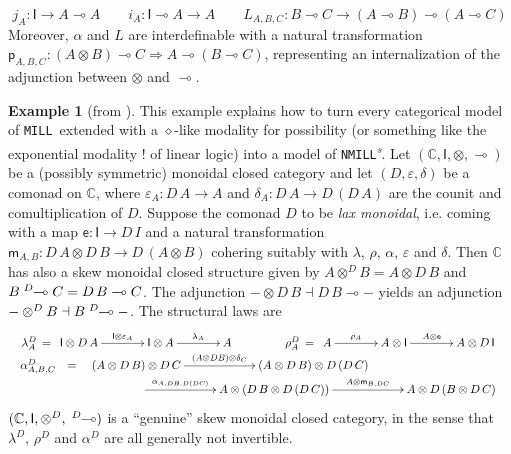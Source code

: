 \documentclass[submission,copyright,creativecommons]{eptcs}
\theoremstyle{definition}
\newtheorem{example}{Example}[section]
\newcommand{\ot}{\otimes}
\newcommand{\lolli}{\multimap}
\newcommand{\I}{\mathsf{I}}
\newcommand{\otd}{\ot^D}
\newcommand{\lollid}{\;\textsuperscript{$D$}\!\!\lolli}
\newcommand{\MILL}{\texttt{MILL}}
\newcommand{\NMILL}{\texttt{NMILL}}
\newcommand{\SkNMILL}{\NMILL\textsuperscript{\textit{s}}}
\begin{document}
\[
j_A : \I \to A \lolli A \qquad i_A : \I \lolli A \to A \qquad L_{A,B,C} : B \lolli C \to (A \lolli B) \lolli (A \lolli C)
\]
Moreover, $\alpha$ and $L$ are interdefinable with a natural transformation $\mathsf{p}_{A , B , C} : (A \ot B) \lolli C \Longrightarrow A \lolli (B \lolli C)$, representing an internalization of the adjunction between $\ot$ and $\lolli$.
\begin{example}[from \cite{uustalu:eilenberg-kelly:2020}]
This example explains how to turn every categorical model of \MILL\ extended with a $\diamond$-like modality for possibility (or something like the exponential modality ! of linear logic) into a model of \SkNMILL. 
Let $(\mathbb{C},\I,\ot,\lolli)$ be a (possibly symmetric) monoidal closed category and let $(D,\varepsilon, \delta)$ be a comonad on $\mathbb{C}$, where $\varepsilon_A : D\,A \to A$ and $\delta_A : D\,A \to D\,(D\,A)$ are the counit and comultiplication of $D$. Suppose the comonad $D$ to be \emph{lax monoidal}, i.e. coming with a map $\mathsf{e} : \I \to D\,I$ and a natural transformation $\mathsf{m}_{A,B} : D \,A \ot D\,B \to D\,(A \ot B)$ cohering suitably with $\lambda$, $\rho$, $\alpha$, $\varepsilon$ and $\delta$.
Then $\mathbb{C}$ has also a skew monoidal closed structure given by  $A \otd B = A \ot D\,B$ and $B \lollid C = D\,B \lolli C$. The adjunction $- \ot D\,B \dashv D\,B \lolli -$ yields an adjunction $- \otd B \dashv B \lollid -$. The structural laws are
\[
\begin{array}{c}
\lambda^D_A \, = \, \xymatrix@C=3pc{\I \ot D\,A \ar[r]^-{\I \ot \varepsilon_A} & \I \ot A \ar[r]^-{\lambda_A} & A} 
\hspace*{1.5cm}
\rho^D_A \, = \, \xymatrix@C=3pc{A \ar[r]^-{\rho_A} & A \ot \I \ar[r]^-{A \ot \mathsf{e}} & A \ot D\,\I} 
\\
\begin{array}{rcl}
\alpha^D_{A,B,C} & = & \xymatrix@C=5pc{(A \ot D\,B) \ot D\,C 
                   \ar[r]^-{(A \ot D B) \ot \delta_C}
                   & (A \ot D\,B) \ot D\,(D\,C)} \\
& & \hspace*{1.5cm} \xymatrix@C=5pc{\ar[r]^-{\alpha_{A,DB,D(DC)}}
                  & A \ot (D\,B \ot D\,(D\,C)) \ar[r]^-{A \ot \mathsf{m}_{B,DC}}
                  & A \ot D\,(B \ot D\,C)}
\end{array}
\end{array}
\]
$(\mathbb{C},\I,\otd,\lollid)$  is a ``genuine'' skew monoidal closed category, in the sense that $\lambda^D$, $\rho^D$ and $\alpha^D$ are all generally not invertible.
\end{example}
\end{document}
